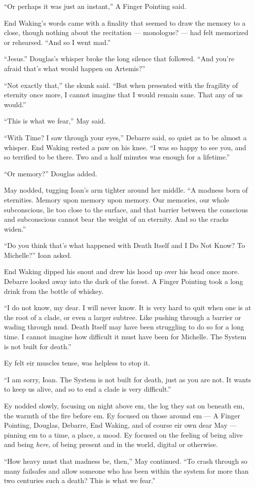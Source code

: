 ``Or perhaps it was just an instant,'' A Finger Pointing said.

End Waking's words came with a finality that seemed to draw the memory to a close, though nothing about the recitation — monologue? — had felt memorized or rehearsed. ``And so I went mad.''

``Jesus.'' Douglas's whisper broke the long silence that followed. ``And you're afraid that's what would happen on Artemis?''

``Not exactly that,'' the skunk said. ``But when presented with the fragility of eternity once more, I cannot imagine that I would remain sane. That any of us would.''

``This is what we fear,'' May said.

``With Time? I saw through your eyes,'' Debarre said, so quiet as to be almost a whisper. End Waking rested a paw on his knee. ``I was so happy to see you, and so terrified to be there. Two and a half minutes was enough for a lifetime.''

``Or memory?'' Douglas added.

May nodded, tugging Ioan's arm tighter around her middle. ``A madness born of eternities. Memory upon memory upon memory. Our memories, our whole subconscious, lie too close to the surface, and that barrier between the conscious and subconscious cannot bear the weight of an eternity. And so the cracks widen.''

``Do you think that's what happened with Death Itself and I Do Not Know? To Michelle?'' Ioan asked.

End Waking dipped his snout and drew his hood up over his head once more. Debarre looked away into the dark of the forest. A Finger Pointing took a long drink from the bottle of whiskey.

``I do not know, my dear. I will never know. It is very hard to quit when one is at the root of a clade, or even a larger subtree. Like pushing through a barrier or wading through mud. Death Itself may have been struggling to do so for a long time. I cannot imagine how difficult it must have been for Michelle. The System is not built for death.''

Ey felt eir muscles tense, was helpless to stop it.

``I am sorry, Ioan. The System is not built for death, just as you are not. It wants to keep us alive, and so to end a clade is very difficult.''

Ey nodded slowly, focusing on night above em, the log they sat on beneath em, the warmth of the fire before em. Ey focused on those around em — A Finger Pointing, Douglas, Debarre, End Waking, and of course eir own dear May — pinning em to a time, a place, a mood. Ey focused on the feeling of being alive and being \emph{here}, of being present and in the world, digital or otherwise.

``How heavy must that madness be, then,'' May continued. ``To crash through so many failsafes and allow someone who has been within the system for more than two centuries such a death? This is what we fear.''
